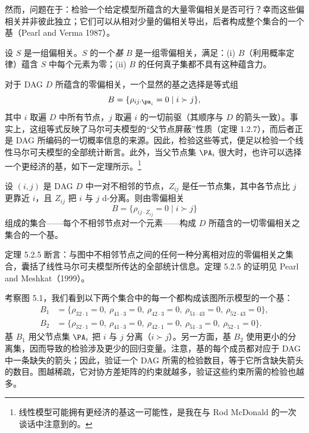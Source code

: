 然而，问题在于：检验一个给定模型所蕴含的大量零偏相关是否可行？幸而这些偏相关并非彼此独立；它们可以从相对少量的偏相关导出，后者构成整个集合的一个基（Pearl and Verma 1987）。

\begin{definition}[基]
设 $S$ 是一组偏相关。$S$ 的一个\emph{基} $B$ 是一组零偏相关，满足：(i) $B$（利用概率定律）蕴含 $S$ 中每个元素为零；(ii) $B$ 的任何真子集都不具有这种蕴含力。
\end{definition}

对于 DAG $D$ 所蕴含的零偏相关，一个显然的基之选择是等式组
\[
B=\{\rho_{ij\cdot \pa_i}=0\mid i\succ j\},
\]
其中 $i$ 取遍 $D$ 中所有节点，$j$ 取遍 $i$ 的一切前驱（其顺序与 $D$ 的箭头一致）。事实上，这组等式反映了马尔可夫模型的“父节点屏蔽”性质（定理 1.2.7），而后者正是 DAG 所编码的一切概率信息的来源。因此，检验这些等式，便足以检验一个线性马尔可夫模型的全部统计断言。此外，当父节点集 $\PA_i$ 很大时，也许可以选择一个更经济的基，如下一定理所示。\footnote{线性模型可能拥有更经济的基这一可能性，是我在与 Rod McDonald 的一次谈话中注意到的。}

\begin{theorem}[图形基]
设 $(i,j)$ 是 DAG $D$ 中一对不相邻的节点，$Z_{ij}$ 是任一节点集，其中各节点比 $j$ 更靠近 $i$，且 $Z_{ij}$ 把 $i$ 与 $j$ d-分离。则由零偏相关
\[
B=\{\rho_{ij\cdot Z_{ij}}=0\mid i\succ j\}
\]
组成的集合——每个不相邻节点对一个元素——构成 $D$ 所蕴含的一切零偏相关之集合的一个基。
\end{theorem}

定理 5.2.5 断言：与图中不相邻节点之间的任何一种分离相对应的零偏相关之集合，囊括了线性马尔可夫模型所传达的全部统计信息。定理 5.2.5 的证明见 Pearl and Meshkat（1999）。

考察图 5.1，我们看到以下两个集合中的每一个都构成该图所示模型的一个基：
\begin{equation}
\begin{aligned}
B_1&=\{\rho_{32\cdot1}=0,\ \rho_{41\cdot3}=0,\ \rho_{42\cdot3}=0,\ \rho_{51\cdot43}=0,\ \rho_{52\cdot43}=0\},\\
B_2&=\{\rho_{32\cdot1}=0,\ \rho_{41\cdot3}=0,\ \rho_{42\cdot1}=0,\ \rho_{51\cdot3}=0,\ \rho_{52\cdot1}=0\}.
\end{aligned}\tag{5.3}
\end{equation}
基 $B_1$ 用父节点集 $\PA_i$ 把 $i$ 与 $j$ 分离（$i\succ j$）。另一方面，基 $B_2$ 使用更小的分离集，因而导致的检验涉及更少的回归变量。注意，基的每个成员都对应于 DAG 中一条缺失的箭头；因此，验证一个 DAG 所需的检验数目，等于它所含缺失箭头的数目。图越稀疏，它对协方差矩阵的约束就越多，验证这些约束所需的检验也越多。

